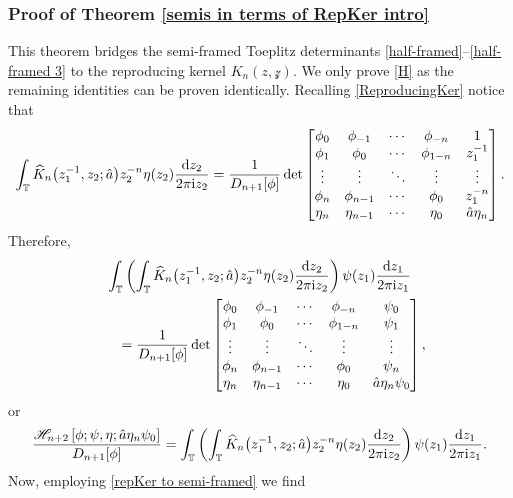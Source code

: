 \documentclass[10pt,a4paper]{amsart}
\numberwithin{equation}{section}
\newcommand{\T}{{\mathbb T}}
\newcommand{\ii}{{\rm i}}
\newcommand{\dd}{{\rm d}}
\begin{document}
\subsubsection{Proof of Theorem \ref{semis in terms of RepKer intro} }
		This theorem bridges the semi-framed Toeplitz determinants \eqref{half-framed}--\eqref{half-framed 3} to the reproducing kernel $K_n(z,\mathcal{z})$.	We only prove \eqref{H} as the remaining identities can be proven identically. Recalling \eqref{ReproducingKer} notice that
		\[
				\int_{\T} \widehat{K}_{n}\big(z^{-1}_1,z_2;\hat{a}\big) z^{-n}_2 \eta(z_2) \frac{\dd z_2}{2 \pi \ii z_2} = \frac{1}{D_{n+1}[\phi]}\det
				\begin{bmatrix}
					\phi_{0} & \phi_{-1} & \cdots & \phi_{-n} & 1\\
					\phi_{1} & \phi_{0} & \cdots & \phi_{1-n} & z^{-1}_1\\
					\vdots & \vdots & \ddots & \vdots & \vdots\\
					\phi_{n} & \phi_{n-1} & \cdots & \phi_{0} & z_1^{-n} \\
					\eta_n & \eta_{n-1} & \cdots & \eta_0 & \hat{a} \eta_n
				\end{bmatrix}.
		\]
		Therefore,
		\begin{gather*}
				\int_{\T} \left(\int_{\T} \widehat{K}_{n}\big(z^{-1}_1,z_2;\hat{a}\big) z^{-n}_2 \eta(z_2) \frac{\dd z_2}{2 \pi \ii z_2} \right) \psi(z_1) \frac{\dd z_1}{2 \pi \ii z_1} \\
\qquad = \frac{1}{D_{n+1}[\phi]}\det
				\begin{bmatrix}
					\phi_{0} & \phi_{-1} & \cdots & \phi_{-n} & \psi_{0}\\
					\phi_{1} & \phi_{0} & \cdots & \phi_{1-n} & \psi_{1}\\
					\vdots & \vdots & \ddots & \vdots & \vdots\\
					\phi_{n} & \phi_{n-1} & \cdots & \phi_{0} & \psi_{n} \\
					\eta_n & \eta_{n-1} & \cdots & \eta_0 & \hat{a} \eta_n \psi_{0}
				\end{bmatrix},
		\end{gather*}
		or
		\begin{equation*} \frac{\mathscr{H}_{n+2}\left[\phi; \psi, \eta ;\hat{a} \eta_n \psi_{0}\right]}{D_{n+1}[\phi]} = \int_{\T} \left(\int_{\T} \widehat{K}_{n}\big(z^{-1}_1,z_2;\hat{a}\big) z^{-n}_2 \eta(z_2) \frac{\dd z_2}{2 \pi \ii z_2} \right) \psi(z_1) \frac{\dd z_1}{2 \pi \ii z_1}.
		\end{equation*}
		Now, employing \eqref{repKer to semi-framed} we find
\end{document}
